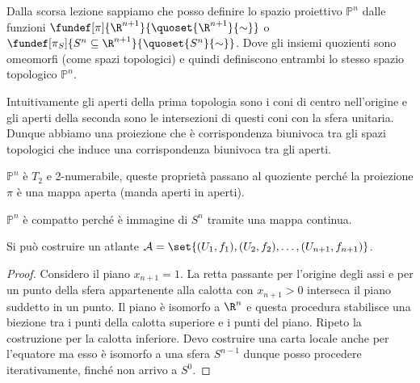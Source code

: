

\begin{defn}
Dalla scorsa lezione sappiamo che posso definire lo spazio proiettivo 
$\mathbb{P}^n$ dalle funzioni $\fundef[\pi]{\R^{n+1}}{\quoset {\R^{n+1}}{\sim}}$ o $\fundef[\pi_S]{S^n \subseteq \R^{n+1}}{\quoset {S^{n}}{\sim}}$. Dove gli insiemi quozienti sono omeomorfi (come spazi topologici) e quindi definiscono entrambi lo stesso spazio topologico $\mathbb{P}^{n}$.
\end{defn}
\begin{oss}
Intuitivamente gli aperti della prima topologia sono i coni di centro nell'origine e gli aperti della seconda sono le intersezioni di questi coni con la sfera unitaria. Dunque abbiamo una proiezione che è corrispondenza biunivoca tra gli spazi topologici che induce una corrispondenza biunivoca tra gli aperti.
\end{oss}
\begin{oss}
$\mathbb{P}^{n}$ è $T_{2}$ e 2-numerabile, queste proprietà passano al quoziente perché la proiezione $\pi$ è una mappa aperta (manda aperti in aperti).
\end{oss}
\begin{oss}
$\mathbb{P}^{n}$ è compatto perché è immagine di $S^{n}$ tramite una mappa continua.
\end{oss}


\begin{prop}
Si può costruire un atlante $\mathcal{A} = \set{{(U_1, f_1), (U_2, f_2), \dots, (U_{n+1}, f_{n+1})}}$.
\end{prop}
\begin{proof}
Considero il piano $x_{n+1} = 1$. La retta passante per l'origine degli assi e per un punto della sfera appartenente alla calotta con $x_{n+1} > 0$ interseca il piano suddetto in un punto. Il piano è isomorfo a $\R^n$ e questa procedura stabilisce una biezione tra i punti della calotta superiore e i punti del piano. Ripeto la costruzione per la calotta inferiore. 
Devo costruire una carta locale anche per l'equatore ma esso è isomorfo a una sfera $S^{n-1}$ dunque posso procedere iterativamente, finché non arrivo a $S^{0}$. 
\end{proof}

